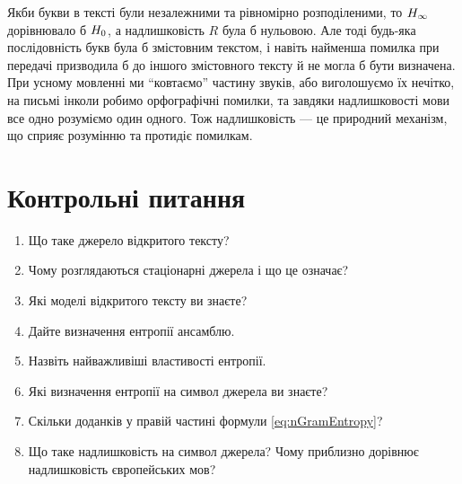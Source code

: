 Якби букви в тексті були незалежними та рівномірно розподіленими, то 
$H_\infty$ дорівнювало б $H_0$, а надлишковість $R$ була
б нульовою. Але тоді будь-яка послідовність букв була б змістовним текстом, і
навіть найменша помилка при передачі  призводила б до іншого змістовного тексту
й не могла б бути визначена. При усному мовленні ми “ковтаємо” частину звуків,
або виголошуємо їх нечітко, на письмі інколи робимо орфографічні помилки, та
завдяки надлишковості мови все одно розуміємо один одного. Тож надлишковість ---
це природний механізм, що сприяє розумінню та протидіє помилкам.

\section{Контрольні питання}

\begin{enumerate}
\item Що таке джерело відкритого тексту?
\item Чому розглядаються стаціонарні джерела і що це означає?
\item Які моделі відкритого тексту ви знаєте?
\item Дайте визначення ентропії ансамблю.
\item Назвіть найважливіші властивості ентропії.
\item Які визначення ентропії на символ джерела ви знаєте?
\item Скільки доданків у правій частині формули \eqref{eq:nGramEntropy}?
\item Що таке надлишковість на символ джерела? Чому приблизно дорівнює
    надлишковість європейських мов?
\end{enumerate}

